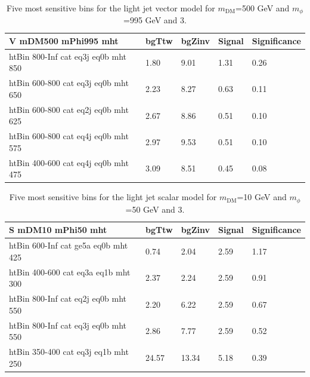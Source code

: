 \begin{table}[h!]
  \centering
  \begin{tabular}{lllll}
    \hline
    \textbf{V mDM500 mPhi995 mht} & bgTtw & bgZinv & Signal & Significance \\ \hline
    htBin 800-Inf cat eq3j eq0b mht 850 & 1.80 & 9.01 & 1.31 &0.26 \\
    htBin 600-800 cat eq3j eq0b mht 650 & 2.23 & 8.27 & 0.63 &0.11 \\
    htBin 600-800 cat eq2j eq0b mht 625 & 2.67 & 8.86 & 0.51 &0.10 \\
    htBin 600-800 cat eq4j eq0b mht 575 & 2.97 & 9.53 & 0.51 &0.10 \\
    htBin 400-600 cat eq4j eq0b mht 475 & 3.09 & 8.51 & 0.45 &0.08 \\
    \hline
  \end{tabular}
  \caption{Five most sensitive bins for the light jet vector model for $m_\textrm{DM}$=500 GeV and $m_\phi$=995 GeV and 3\fbinv. \label{tab:bestBins_V_3fb}}
\end {table}


\begin{table}[h!]
  \centering
  \begin{tabular}{lllll}
    \hline
    \textbf{S mDM10 mPhi50 mht} & bgTtw & bgZinv & Signal & Significance \\ \hline
    htBin 600-Inf cat ge5a eq0b mht 425 & 0.74 & 2.04 & 2.59 &1.17 \\
    htBin 400-600 cat eq3a eq1b mht 300 & 2.37 & 2.24 & 2.59 &0.91 \\
    htBin 800-Inf cat eq2j eq0b mht 550 & 2.20 & 6.22 & 2.59 &0.67 \\
    htBin 800-Inf cat eq3j eq0b mht 550 & 2.86 & 7.77 & 2.59 &0.52 \\
    htBin 350-400 cat eq3j eq1b mht 250 & 24.57 & 13.34 & 5.18 &0.39 \\
    \hline
  \end{tabular}
  \caption{Five most sensitive bins for the light jet scalar model for $m_\textrm{DM}$=10 GeV and $m_\phi$=50 GeV and 3\fbinv. \label{tab:bestBins_S_3fb}}
\end {table}


